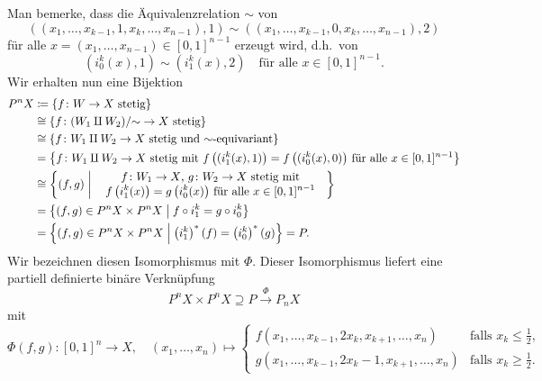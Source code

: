 Man bemerke, dass die Äquivalenzrelation $\sim$ von
\[
        ( (x_1, \dotsc, x_{k-1}, 1, x_k, \dotsc, x_{n-1}), 1)
  \sim  ( (x_1, \dotsc, x_{k-1}, 0, x_k, \dotsc, x_{n-1}), 2)
\]
für alle $x = (x_1, \dotsc, x_{n-1}) \in [0,1]^{n-1}$ erzeugt wird, d.h.\ von
\[
  \left( i_0^k(x), 1 \right) \sim \left( i_1^k(x), 2 \right)
  \quad
  \text{für alle $x \in [0,1]^{n-1}$}.
\]
Wir erhalten nun eine Bijektion
\begin{align*}
              P^n X
  &\coloneqq  \left\{
                \text{$f \colon W \to X$ stetig}
              \right\}
  \\
  &\cong      \left\{
                \text{$f \colon (W_1 \amalg W_2)/{\sim} \to X$ stetig}
              \right\}
  \\
  &\cong      \left\{
                \text{$f \colon W_1 \amalg W_2 \to X$ stetig und $\sim$-equivariant}
              \right\}
  \\
  &=          \left\{
                \text{$f \colon W_1 \amalg W_2 \to X$ stetig
                      mit $f\left( ( i_1^k(x), 1) \right) = f\left( ( i_0^k(x), 0) \right)$ für alle $x \in [0,1]^{n-1}$}
              \right\}
  \\
  &\cong      \left\{
                (f, g)
               \suchthatscale
                \text{
                \begin{tabular}{c}
                  $f \colon W_1 \to X$, $g \colon W_2 \to X$ stetig mit
                \\
                  $f\left( i_1^k(x) \right) = g\left( i_0^k(x) \right)$ für alle $x \in [0,1]^{n-1}$
                \end{tabular}
                }
              \right\}
  \\
  &=          \left\{
                (f, g) \in P^n X \times P^n X
              \suchthatscale
                f \circ i_1^k = g \circ i_0^k
              \right\}
  \\
  &=          \left\{
                (f, g) \in P^n X \times P^n X
              \suchthatscale
                \left( i_1^k \right)^*(f) = \left( i_0^k \right)^*(g)
              \right\}
  =           P.
\end{align*}
Wir bezeichnen diesen Isomorphismus mit $\Phi$.
Dieser Isomorphismus liefert eine partiell definierte binäre Verknüpfung
\[
                      P^n X \times P^n X
  \supseteq           P
  \xrightarrow{\Phi}  P_n X
\]
mit
\[
          \Phi(f,g)
  \colon  [0,1]^n
  \to     X,
  \quad   (x_1, \dotsc, x_n)
  \mapsto \begin{cases}
            f(x_1, \dotsc, x_{k-1}, 2x_k, x_{k+1}, \dotsc, x_n)     & \text{falls $x_k \leq \frac{1}{2}$},  \\
            g(x_1, \dotsc, x_{k-1}, 2x_k - 1, x_{k+1}, \dotsc, x_n) & \text{falls $x_k \geq \frac{1}{2}$}.
          \end{cases}
\]

